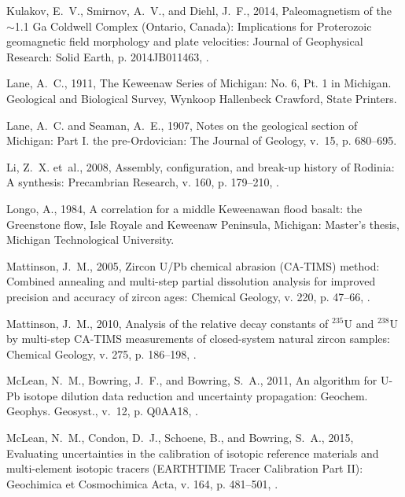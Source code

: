 \documentclass[11pt,letterpaper]{article}
\begin{document}
\begin{thebibliography}{153}
Kulakov, E.~V., Smirnov, A.~V., and Diehl, J.~F., 2014, Paleomagnetism of the
  $\sim$1.1 {G}a {Coldwell Complex (Ontario, Canada): Implications for
  Proterozoic} geomagnetic field morphology and plate velocities: Journal of
  Geophysical Research: Solid Earth, p. 2014JB011463,
  .

Lane, A.~C., 1911, The Keweenaw Series of Michigan: No. 6, Pt. 1 in Michigan.
  Geological and Biological Survey, Wynkoop Hallenbeck Crawford, State
  Printers.

Lane, A.~C. and Seaman, A.~E., 1907, Notes on the geological section of
  {M}ichigan: Part {I}. the pre-{O}rdovician: The Journal of Geology, v.~15, p.
  680--695.

Li, Z.~X. et~al., 2008, Assembly, configuration, and break-up history of
  {R}odinia: A synthesis: Precambrian Research, v. 160, p. 179--210,
  .

Longo, A., 1984, {A correlation for a middle Keweenawan flood basalt: the
  Greenstone flow, Isle Royale and Keweenaw Peninsula, Michigan}: Master's
  thesis, Michigan Technological University.

Mattinson, J.~M., 2005, {Zircon U/Pb chemical abrasion (CA-TIMS) method:
  Combined annealing and multi-step partial dissolution analysis for improved
  precision and accuracy of zircon ages}: Chemical Geology, v. 220, p. 47--66,
  .

Mattinson, J.~M., 2010, Analysis of the relative decay constants of $^{235}${U}
  and $^{238}${U} by multi-step {CA-TIMS} measurements of closed-system natural
  zircon samples: Chemical Geology, v. 275, p. 186--198,
  .

McLean, N.~M., Bowring, J.~F., and Bowring, S.~A., 2011, {An algorithm for U-Pb
  isotope dilution data reduction and uncertainty propagation}: Geochem.
  Geophys. Geosyst., v.~12, p. Q0AA18, .

McLean, N.~M., Condon, D.~J., Schoene, B., and Bowring, S.~A., 2015, Evaluating
  uncertainties in the calibration of isotopic reference materials and
  multi-element isotopic tracers ({EARTHTIME Tracer Calibration Part II}):
  Geochimica et Cosmochimica Acta, v. 164, p. 481--501,
  .


\end{thebibliography}
\end{document}
